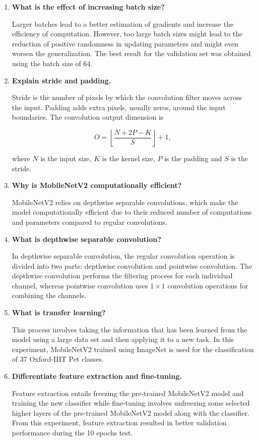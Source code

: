 \documentclass[10pt]{article}
\begin{document}
\begin{enumerate}
\item \textbf{What is the effect of increasing batch size?}

Larger batches lead to a better estimation of gradients and increase the efficiency of computation. However, too large batch sizes might lead to the reduction of positive randomness in updating parameters and might even worsen the generalization. The best result for the validation set was obtained using the batch size of $64$.

\item \textbf{Explain stride and padding.}

Stride is the number of pixels by which the convolution filter moves across the input. Padding adds extra pixels, usually zeros, around the input boundaries. The convolution output dimension is

\[
O=\left\lfloor\frac{N+2P-K}{S}\right\rfloor+1,
\]

where $N$ is the input size, $K$ is the kernel size, $P$ is the padding and $S$ is the stride.

\item \textbf{Why is MobileNetV2 computationally efficient?}

MobileNetV2 relies on depthwise separable convolutions, which make the model computationally efficient due to their reduced number of computations and parameters compared to regular convolutions.

\item \textbf{What is depthwise separable convolution?}

In depthwise separable convolution, the regular convolution operation is divided into two parts: depthwise convolution and pointwise convolution. The depthwise convolution performs the filtering process for each individual channel, whereas pointwise convolution uses $1\times1$ convolution operations for combining the channels.

\item \textbf{What is transfer learning?}

This process involves taking the information that has been learned from the model using a large data set and then applying it to a new task. In this experiment, MobileNetV2 trained using ImageNet is used for the classification of 37 Oxford-IIIT Pet classes.

\item \textbf{Differentiate feature extraction and fine-tuning.}

Feature extraction entails freezing the pre-trained MobileNetV2 model and training the new classifier while fine-tuning involves unfreezing some selected higher layers of the pre-trained MobileNetV2 model along with the classifier. From this experiment, feature extraction resulted in better validation performance during the 10 epochs test.


\end{enumerate}
\end{document}
